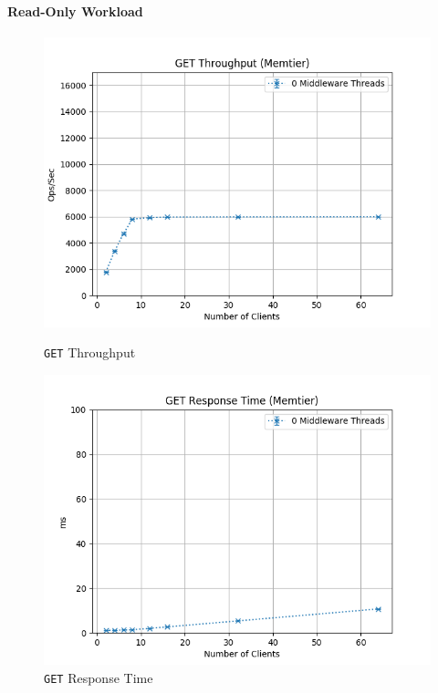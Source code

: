 \documentclass[11pt,a4paper]{article}
\begin{document}
\paragraph{Read-Only Workload}
%
\begin{figure}[H]
	\centering
	\captionsetup{width=0.4\textwidth}
    \begin{minipage}{0.5\textwidth}
        \centering
        \includegraphics[width=\textwidth]{../illustrations/plots/1_2_two_servers/0-1/memtier_get_tp_s.png}
        \caption{\texttt{GET} Throughput}
        \label{fig:two_servers_get_tp}
    \end{minipage}\hfill
    \begin{minipage}{0.5\textwidth}
        \centering
        \includegraphics[width=\textwidth]{../illustrations/plots/1_2_two_servers/0-1/memtier_get_rt_ms.png}
        \caption{\texttt{GET} Response Time}
        \label{fig:two_servers_get_rt}
    \end{minipage}
\end{figure}
\end{document}
